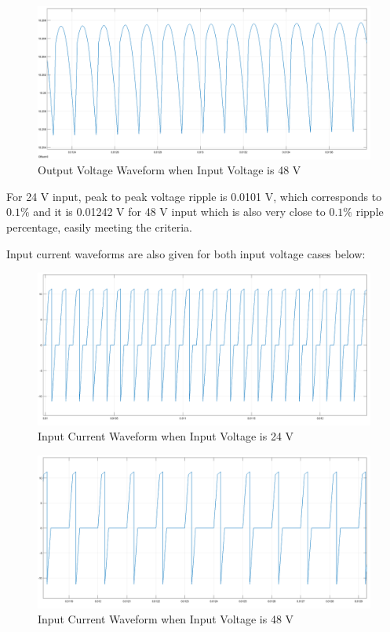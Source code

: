 \documentclass{article}
\newcommand\tab[1][1cm]{\hspace*{#1}}
\begin{document}
\begin{figure}[H]
    \centering
    \includegraphics[scale=0.2]{48v_output.png}
    \caption{Output Voltage Waveform when Input Voltage is 48 V}
    \label{fig:my_label}
\end{figure}
\tab For 24 V input, peak to peak voltage ripple is 0.0101 V, which corresponds to $0.1 \%$ and it is 0.01242 V for 48 V input which is also very close to $0.1 \%$ ripple percentage, easily meeting the criteria. 

\tab Input current waveforms are also given for both input voltage cases below:
\begin{figure}[H]
    \centering
    \includegraphics[scale=0.2]{24v_input current.png}
    \caption{Input Current Waveform when Input Voltage is 24 V}
    \label{fig:my_label}
\end{figure}

\begin{figure}[H]
    \centering
    \includegraphics[scale=0.2]{48v_input current.png}
    \caption{Input Current Waveform when Input Voltage is 48 V}
    \label{fig:my_label}
\end{figure}
\end{document}
